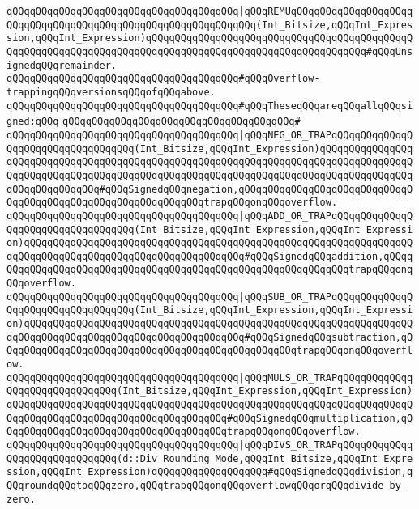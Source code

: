 \verb|qQQqqQQqqQQqqQQqqQQqqQQqqQQqqQQqqQQqqQQq|\verb#|qQQqREMUqQQqqQQqqQQqqQQqqQQqqQQqqQQqqQQqqQQqqQQqqQQqqQQqqQQqqQQqqQQqqQQq(Int_Bitsize,qQQqInt_Expression,qQQqInt_Expression)qQQqqQQqqQQqqQQqqQQqqQQqqQQqqQQqqQQqqQQqqQQqqQQqqQQqqQQqqQQqqQQqqQQqqQQqqQQqqQQqqQQqqQQqqQQqqQQqqQQqqQQqqQQq#\verb|#qQQqUnsignedqQQqremainder.|\newline
\newline
\verb|qQQqqQQqqQQqqQQqqQQqqQQqqQQqqQQqqQQqqQQq#qQQqOverflow-trappingqQQqversionsqQQqofqQQqabove.|\newline
\verb|qQQqqQQqqQQqqQQqqQQqqQQqqQQqqQQqqQQqqQQq#qQQqTheseqQQqareqQQqallqQQqsigned:qQQq|\newline
\verb|qQQqqQQqqQQqqQQqqQQqqQQqqQQqqQQqqQQqqQQq#|\newline
\verb|qQQqqQQqqQQqqQQqqQQqqQQqqQQqqQQqqQQqqQQq|\verb#|qQQqNEG_OR_TRAPqQQqqQQqqQQqqQQqqQQqqQQqqQQqqQQqqQQq(Int_Bitsize,qQQqInt_Expression)qQQqqQQqqQQqqQQqqQQqqQQqqQQqqQQqqQQqqQQqqQQqqQQqqQQqqQQqqQQqqQQqqQQqqQQqqQQqqQQqqQQqqQQqqQQqqQQqqQQqqQQqqQQqqQQqqQQqqQQqqQQqqQQqqQQqqQQqqQQqqQQqqQQqqQQqqQQqqQQqqQQqqQQqqQQq#\verb|#qQQqSignedqQQqnegation,qQQqqQQqqQQqqQQqqQQqqQQqqQQqqQQqqQQqqQQqqQQqqQQqqQQqqQQqqQQqqQQqtrapqQQqonqQQqoverflow.|\newline
\verb|qQQqqQQqqQQqqQQqqQQqqQQqqQQqqQQqqQQqqQQq|\verb#|qQQqADD_OR_TRAPqQQqqQQqqQQqqQQqqQQqqQQqqQQqqQQqqQQq(Int_Bitsize,qQQqInt_Expression,qQQqInt_Expression)qQQqqQQqqQQqqQQqqQQqqQQqqQQqqQQqqQQqqQQqqQQqqQQqqQQqqQQqqQQqqQQqqQQqqQQqqQQqqQQqqQQqqQQqqQQqqQQqqQQqqQQqqQQq#\verb|#qQQqSignedqQQqaddition,qQQqqQQqqQQqqQQqqQQqqQQqqQQqqQQqqQQqqQQqqQQqqQQqqQQqqQQqqQQqqQQqtrapqQQqonqQQqoverflow.|\newline
\verb|qQQqqQQqqQQqqQQqqQQqqQQqqQQqqQQqqQQqqQQq|\verb#|qQQqSUB_OR_TRAPqQQqqQQqqQQqqQQqqQQqqQQqqQQqqQQqqQQq(Int_Bitsize,qQQqInt_Expression,qQQqInt_Expression)qQQqqQQqqQQqqQQqqQQqqQQqqQQqqQQqqQQqqQQqqQQqqQQqqQQqqQQqqQQqqQQqqQQqqQQqqQQqqQQqqQQqqQQqqQQqqQQqqQQqqQQqqQQq#\verb|#qQQqSignedqQQqsubtraction,qQQqqQQqqQQqqQQqqQQqqQQqqQQqqQQqqQQqqQQqqQQqqQQqqQQqtrapqQQqonqQQqoverflow.|\newline
\verb|qQQqqQQqqQQqqQQqqQQqqQQqqQQqqQQqqQQqqQQq|\verb#|qQQqMULS_OR_TRAPqQQqqQQqqQQqqQQqqQQqqQQqqQQqqQQq(Int_Bitsize,qQQqInt_Expression,qQQqInt_Expression)qQQqqQQqqQQqqQQqqQQqqQQqqQQqqQQqqQQqqQQqqQQqqQQqqQQqqQQqqQQqqQQqqQQqqQQqqQQqqQQqqQQqqQQqqQQqqQQqqQQqqQQqqQQq#\verb|#qQQqSignedqQQqmultiplication,qQQqqQQqqQQqqQQqqQQqqQQqqQQqqQQqqQQqqQQqtrapqQQqonqQQqoverflow.|\newline
\verb|qQQqqQQqqQQqqQQqqQQqqQQqqQQqqQQqqQQqqQQq|\verb#|qQQqDIVS_OR_TRAPqQQqqQQqqQQqqQQqqQQqqQQqqQQqqQQq(d::Div_Rounding_Mode,qQQqInt_Bitsize,qQQqInt_Expression,qQQqInt_Expression)qQQqqQQqqQQqqQQqqQQq#\verb|#qQQqSignedqQQqdivision,qQQqroundqQQqtoqQQqzero,qQQqtrapqQQqonqQQqoverflowqQQqorqQQqdivide-by-zero.|\newline
